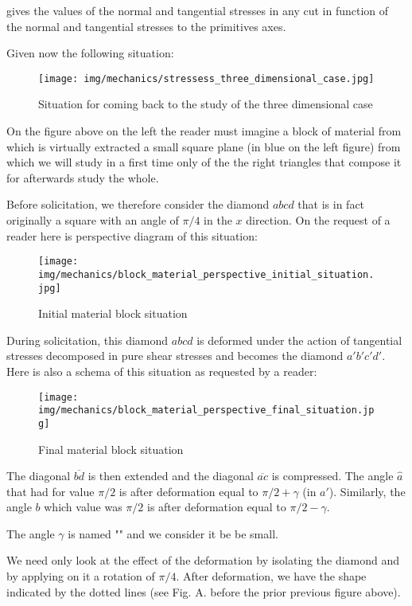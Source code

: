 	gives the values of the normal and tangential stresses in any cut in function of the normal and tangential stresses to the primitives axes.
	
	Given now the following situation:
	\begin{figure}[H]
		\centering
		\texttt{[image: img/mechanics/stressess\_three\_dimensional\_case.jpg]}
		\caption[]{Situation for coming back to the study of the three dimensional case}
	\end{figure}
	On the figure above on the left the reader must imagine a block of material from which is virtually extracted a small square plane (in blue on the left figure) from which we will study in a first time only of the the right triangles that compose it for afterwards study the whole.
	
	Before solicitation, we therefore consider the diamond $abcd$ that is in fact originally a square with an angle of $\pi/4$ in the $x$ direction. On the request of a reader here is perspective diagram of this situation:
	\begin{figure}[H]
		\centering
		\texttt{[image: img/mechanics/block\_material\_perspective\_initial\_situation.jpg]}
		\caption[]{Initial material block situation}
	\end{figure}
	During solicitation, this diamond $abcd$ is deformed under the action of tangential stresses decomposed in pure shear stresses and becomes the diamond $a'b'c'd'$. Here is also a schema of this situation as requested by a reader:
	\begin{figure}[H]
		\centering
		\texttt{[image: img/mechanics/block\_material\_perspective\_final\_situation.jpg]}
		\caption[]{Final material block situation}
	\end{figure}
	The diagonal $\overline{bd}$ is then extended and the diagonal $\overline{ac}$ is compressed. The angle $\hat{a}$ that had for value $\pi/2$ is after deformation equal to $\pi/2+\gamma$ (in $a'$). Similarly, the angle $b$ which value was $\pi/2$ is after deformation equal to $\pi/2-\gamma$.
	
	\begin{tcolorbox}[title=Remark,colframe=black,arc=10pt]
	The angle $\gamma$ is named "" and we consider it be be small.
	\end{tcolorbox}
	We need only look at the effect of the deformation by isolating the diamond and by applying on it a rotation of $\pi/4$. After deformation, we have the shape indicated by the dotted lines (see Fig. A. before the prior previous figure above).

